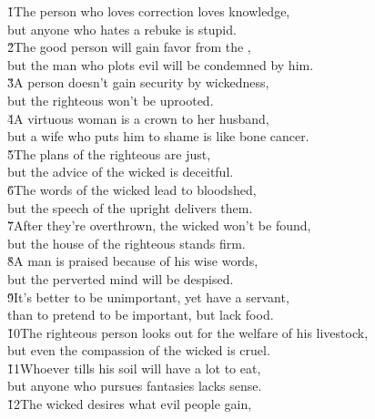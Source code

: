 \begin{poetry}
\poeml {}
\v{1}The person who loves correction loves knowledge, \\
\poeml but anyone who hates a rebuke is stupid. \\
\poeml \v{2}The good person will gain favor from the , \\
\poemll    but the man who plots evil will be condemned by him. \\
\poeml \v{3}A person doesn't gain security by wickedness, \\
\poemll    but the righteous won't be uprooted. \\
\poeml \v{4}A virtuous woman is a crown to her husband, \\
\poemll    but a wife who puts him to shame is like bone cancer. \\
\poeml \v{5}The plans of the righteous are just, \\
\poemll    but the advice of the wicked is deceitful. \\
\poeml \v{6}The words of the wicked lead to bloodshed, \\
\poemll    but the speech of the upright delivers them. \\
\poeml \v{7}After they're overthrown, the wicked won't be found, \\
\poemll    but the house of the righteous stands firm. \\
\poeml \v{8}A man is praised because of his wise words, \\
\poemll    but the perverted mind will be despised. \\
\poeml \v{9}It's better to be unimportant, yet have a servant, \\
\poemll    than to pretend to be important, but lack food. \\
\poeml \v{10}The righteous person looks out for the welfare of his livestock, \\
\poemll    but even the compassion of the wicked is cruel. \\
\poeml \v{11}Whoever tills his soil will have a lot to eat, \\
\poemll    but anyone who pursues fantasies lacks sense. \\
\poeml \v{12}The wicked desires what evil people gain, \\

\end{poetry}
